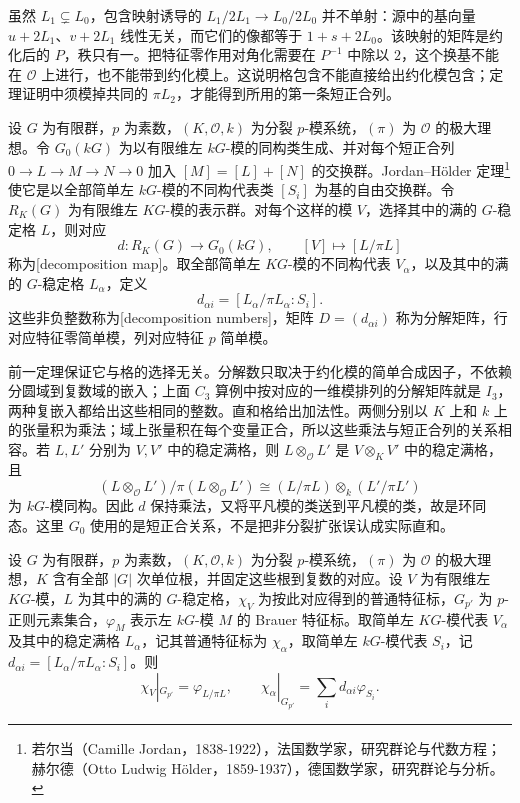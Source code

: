\ProseParagraphBreak
虽然 \(L_1\subsetneq L_0\)，包含映射诱导的 \(L_1/2L_1\to L_0/2L_0\) 并不单射：源中的基向量 \(u+2L_1\)、\(v+2L_1\) 线性无关，而它们的像都等于 \(1+s+2L_0\)。该映射的矩阵是约化后的 \(P\)，秩只有一。把特征零作用对角化需要在 \(P^{-1}\) 中除以 \(2\)，这个换基不能在 \(\mathcal O\) 上进行，也不能带到约化模上。这说明格包含不能直接给出约化模包含；定理证明中须模掉共同的 \(\pi L_2\)，才能得到所用的第一条短正合列。
\begin{definition}\label{b5:def:decomposition-map}
	设 \(G\) 为有限群，\(p\) 为素数，\((K,\mathcal O,k)\) 为分裂 \(p\)-模系统，\((\pi)\) 为 \(\mathcal O\) 的极大理想。令 \(G_0(kG)\) 为以有限维左 \(kG\)-模的同构类生成、并对每个短正合列 \(0\to L\to M\to N\to0\) 加入 \([M]=[L]+[N]\) 的交换群。Jordan--Hölder 定理\footnote{若尔当（Camille Jordan，1838-1922），法国数学家，研究群论与代数方程；赫尔德（Otto Ludwig Hölder，1859-1937），德国数学家，研究群论与分析。}使它是以全部简单左 \(kG\)-模的不同构代表类 \([S_i]\) 为基的自由交换群。令 \(R_K(G)\) 为有限维左 \(KG\)-模的表示群。对每个这样的模 \(V\)，选择其中的满的 \(G\)-稳定格 \(L\)，则对应
	\[
		d:R_K(G)\longrightarrow G_0(kG),\qquad [V]\longmapsto[L/\pi L]
	\]
	称为[decomposition map]。取全部简单左 \(KG\)-模的不同构代表 \(V_\alpha\)，以及其中的满的 \(G\)-稳定格 \(L_\alpha\)，定义
	\[
		d_{\alpha i}=[L_\alpha/\pi L_\alpha:S_i].
	\]
	这些非负整数称为[decomposition numbers]，矩阵 \(D=(d_{\alpha i})\) 称为分解矩阵，行对应特征零简单模，列对应特征 \(p\) 简单模。
\end{definition}
前一定理保证它与格的选择无关。分解数只取决于约化模的简单合成因子，不依赖分圆域到复数域的嵌入；上面 \(C_3\) 算例中按对应的一维模排列的分解矩阵就是 \(I_3\)，两种复嵌入都给出这些相同的整数。直和格给出加法性。两侧分别以 \(K\) 上和 \(k\) 上的张量积为乘法；域上张量积在每个变量正合，所以这些乘法与短正合列的关系相容。若 \(L,L'\) 分别为 \(V,V'\) 中的稳定满格，则 \(L\otimes_{\mathcal O}L'\) 是 \(V\otimes_KV'\) 中的稳定满格，且
\[
	(L\otimes_{\mathcal O}L')/\pi(L\otimes_{\mathcal O}L') \cong (L/\pi L)\otimes_k(L'/\pi L')
\]
为 \(kG\)-模同构。因此 \(d\) 保持乘法，又将平凡模的类送到平凡模的类，故是环同态。这里 \(G_0\) 使用的是短正合关系，不是把非分裂扩张误认成实际直和。
\begin{proposition}\label{b5:prop:ordinary-brauer-restriction}
	设 \(G\) 为有限群，\(p\) 为素数，\((K,\mathcal O,k)\) 为分裂 \(p\)-模系统，\((\pi)\) 为 \(\mathcal O\) 的极大理想，\(K\) 含有全部 \(|G|\) 次单位根，并固定这些根到复数的对应。设 \(V\) 为有限维左 \(KG\)-模，\(L\) 为其中的满的 \(G\)-稳定格，\(\chi_V\) 为按此对应得到的普通特征标，\(G_{p'}\) 为 \(p\)-正则元素集合，\(\varphi_M\) 表示左 \(kG\)-模 \(M\) 的 Brauer 特征标。取简单左 \(KG\)-模代表 \(V_\alpha\) 及其中的稳定满格 \(L_\alpha\)，记其普通特征标为 \(\chi_\alpha\)，取简单左 \(kG\)-模代表 \(S_i\)，记 \(d_{\alpha i}=[L_\alpha/\pi L_\alpha:S_i]\)。则
	\[
		\chi_V|_{G_{p'}}=\varphi_{L/\pi L},\qquad \chi_\alpha|_{G_{p'}}=\sum_i d_{\alpha i}\varphi_{S_i}.
	\]
\end{proposition}
